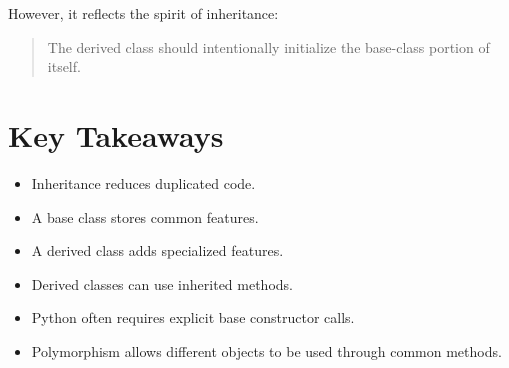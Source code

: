 \documentclass[11pt]{article}
\begin{document}
However, it reflects the spirit of inheritance:

\begin{quote}
The derived class should intentionally initialize the base-class portion of itself.
\end{quote}

\section{Key Takeaways}

\begin{itemize}
    \item Inheritance reduces duplicated code.
    \item A base class stores common features.
    \item A derived class adds specialized features.
    \item Derived classes can use inherited methods.
    \item Python often requires explicit base constructor calls.
    \item Polymorphism allows different objects to be used through common methods.
\end{itemize}
\end{document}
